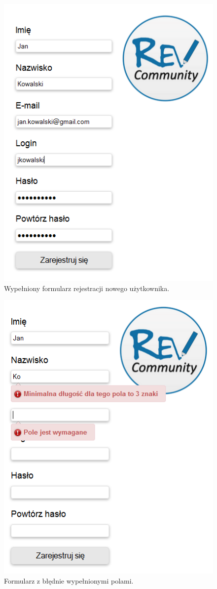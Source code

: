 \begin{figure}[h]
	\centering
	\includegraphics[scale=0.6]{images/rejestracja.png}
	\caption{Wypełniony formularz rejestracji nowego użytkownika.}
\end{figure}

\begin{figure}[h]
	\centering
	\includegraphics[scale=0.6]{images/rejestracja_walidacja.png}
	\caption{Formularz z błędnie wypełnionymi polami.}
\end{figure}


